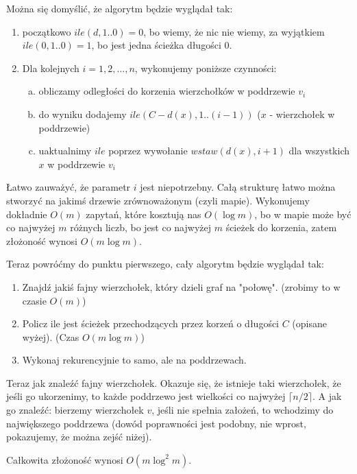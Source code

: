 \noindent Można się domyślić, że algorytm będzie wyglądał tak:

\begin{enumerate}[1.]
\item początkowo $ile(d, 1..0) = 0$, bo wiemy, że nic nie wiemy, za wyjątkiem $ile(0, 1..0) = 1$, bo jest jedna ścieżka długości $0$.
\item Dla kolejnych $i = 1, 2, \ldots, n$, wykonujemy poniższe czynności:
\begin{enumerate}[a)]
\item obliczamy odległości do korzenia wierzchołków w poddrzewie $v_i$
\item do wyniku dodajemy $ile(C - d(x), 1..(i-1))$ ($x$ - wierzchołek w poddrzewie)
\item uaktualnimy $ile$ poprzez wywołanie $wstaw(d(x), i+1)$ dla wszystkich $x$ w poddrzewie $v_i$
\end{enumerate}
\end{enumerate}
Łatwo zauważyć, że parametr $i$ jest niepotrzebny. Całą strukturę łatwo można stworzyć na jakimś drzewie zrównoważonym (czyli mapie). Wykonujemy dokładnie $O(m)$ zapytań, które kosztują nas $O(\log m)$, bo w mapie może być co najwyżej $m$ różnych liczb, bo jest co najwyżej $m$ ścieżek do korzenia, zatem złożoność wynosi $O(m \log m)$.


\noindent Teraz powróćmy do punktu pierwszego, cały algorytm będzie wyglądał tak:
\begin{enumerate}[1.]
\item Znajdź jakiś fajny wierzchołek, który dzieli graf na "połowę". (zrobimy to w czasie $O(m)$)
\item Policz ile jest ścieżek przechodzących przez korzeń o długości $C$ (opisane wyżej). (Czas $O(m \log m)$)
\item Wykonaj rekurencyjnie to samo, ale na poddrzewach.
\end{enumerate}


Teraz jak znaleźć fajny wierzchołek. Okazuje się, że istnieje taki wierzchołek, że jeśli go ukorzenimy, to każde poddrzewo jest wielkości co najwyżej $\lceil n/2 \rceil$. A jak go znaleźć: bierzemy wierzchołek $v$, jeśli nie spełnia założeń, to wchodzimy do największego poddrzewa (dowód poprawności jest podobny, nie wprost, pokazujemy, że można zejść niżej).

Całkowita złożoność wynosi $O(m \log^2 m)$.

\section{} %
